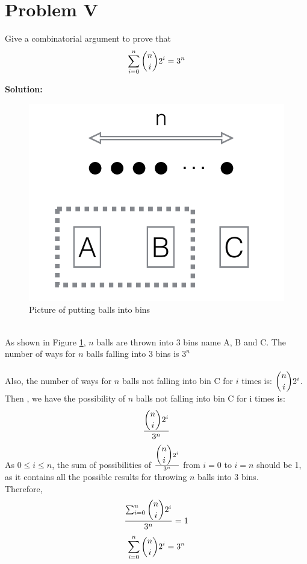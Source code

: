 \section{Problem V}
Give a combinatorial argument to prove that
$$ \sum_{i=0}^{n}\dbinom{n}{i}2^{i} = 3^n $$

\textbf{Solution:} \\
\begin{figure}[h]
\centering
\includegraphics[scale=0.25]{p5img}
\caption{Picture of putting balls into bins}
\label{fig:p5}
\end{figure}\\

As shown in Figure \ref{fig:p5}, $n$ balls are thrown into 3 bins name A, B and C. The number of ways for $n$ balls falling into 3 bins is $3^n$ \\
\\
Also, the number of ways for $n$ balls not falling into bin C for $i$ times is: $\dbinom{n}{i} 2^{i}$. Then , we have the possibility of $n$ balls not falling into bin C for i times is:
$$\frac{\dbinom{n}{i} 2^{i}}{3^n}$$
As $0 \leq i \leq n$, the sum of possibilities of $\frac{\dbinom{n}{i} 2^{i}}{3^n}$ from $i = 0$ to $i = n$ should be 1, as it contains all the possible results for throwing $n$ balls into 3 bins.\\
Therefore,
$$ \frac{\sum_{i=0}^{n}\dbinom{n}{i}2^{i}}{3^n} = 1$$
$$\sum_{i=0}^{n}\dbinom{n}{i}2^{i} = 3^n$$